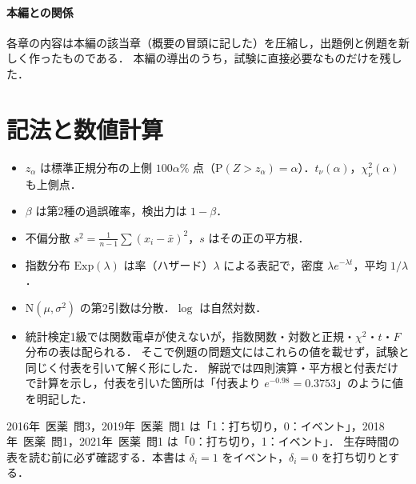 \documentclass[a4paper,11pt,openany]{ltjsbook}
\newcommand{\kakomon}[2]{\mbox{#1年 医薬 問#2}}
\newcommand{\Prob}{\mathrm{P}}
\newcommand{\Normal}{\mathrm{N}}
\newcommand{\Ex}{\mathrm{Exp}}
\begin{document}
\paragraph{本編との関係}
各章の内容は本編の該当章（概要の冒頭に記した）を圧縮し，出題例と例題を新しく作ったものである．
本編の導出のうち，試験に直接必要なものだけを残した．

\section*{記法と数値計算}
\begin{itemize}
\item $z_\alpha$ は標準正規分布の上側 $100\alpha\%$ 点（$\Prob(Z>z_\alpha)=\alpha$）．$t_\nu(\alpha)$，$\chi^2_\nu(\alpha)$ も上側点．
\item $\beta$ は第2種の過誤確率，検出力は $1-\beta$．
\item 不偏分散 $s^2=\frac1{n-1}\sum(x_i-\bar x)^2$，$s$ はその正の平方根．
\item 指数分布 $\Ex(\lambda)$ は率（ハザード）$\lambda$ による表記で，密度 $\lambda e^{-\lambda t}$，平均 $1/\lambda$．
\item $\Normal(\mu,\sigma^2)$ の第2引数は分散．$\log$ は自然対数．
\item 統計検定1級では関数電卓が使えないが，指数関数・対数と正規・$\chi^2$・$t$・$F$ 分布の表は配られる．
      そこで例題の問題文にはこれらの値を載せず，試験と同じく付表を引いて解く形にした．
      解説では四則演算・平方根と付表だけで計算を示し，付表を引いた箇所は「付表より $e^{-0.98}=0.3753$」のように値を明記した．
\end{itemize}

\begin{warnbox}[打ち切り指示変数の向きは年度で逆]
\kakomon{2016}{3}，\kakomon{2019}{1} は「1：打ち切り，0：イベント」，\kakomon{2018}{1}，\kakomon{2021}{1} は「0：打ち切り，1：イベント」．
生存時間の表を読む前に必ず確認する．本書は $\delta_i=1$ をイベント，$\delta_i=0$ を打ち切りとする．
\end{warnbox}

\end{document}
